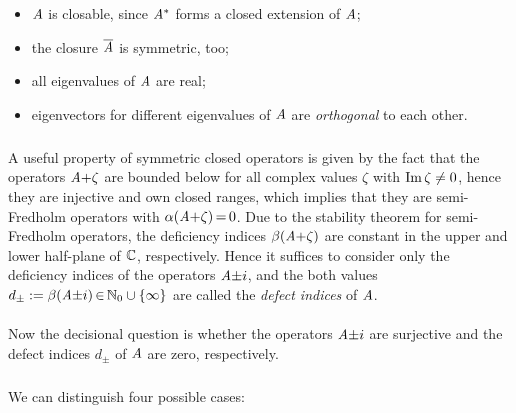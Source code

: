 \documentclass[11pt,twoside]{article}
\begin{document}
\begin{itemize}[leftmargin=9mm]
\item[(a)]
$\mathit{A}$ is closable,
since $\mathit{A}^*$ forms a closed extension of $\mathit{A}$;
\item[(b)]
the closure $\overline{\mathit{A}}$ is symmetric, too;
\item[(c)]
all eigenvalues of $\mathit{A}$ are real;
\item[(d)]
eigenvectors for different eigenvalues of $\mathit{A}$
are \textit{orthogonal} to each other.
\end{itemize}

\subparagraph{} %
A useful property of symmetric closed operators is given by the fact
that the operators $\mathit{A} {+} \zeta$ are bounded below
for all complex values $\zeta$ with $\operatorname{Im} \zeta \neq 0$,
hence they are injective and own closed ranges,
which implies that they are semi-Fredholm operators
with $\alpha(\mathit{A} {+} \zeta) {\,=\,} 0$.
Due to the stability theorem for semi-Fredholm operators,
the deficiency indices $\beta(\mathit{A} {+} \zeta)$ are constant
in the upper and lower half-plane of ${\mathbb{C}}$,
respectively.
Hence it suffices to consider only the deficiency indices 
of the operators $\mathit{A} {\pm} i$,
and the both values
$d_{\pm} := \beta(\mathit{A} {\pm} i) {\,\in\,} {\mathbb{N}}_0 \cup \{\infty\}$
are called the \textit{defect indices} of $\mathit{A}$.

\paragraph{} %
Now the decisional question is
whether the operators $\mathit{A} {\pm} i$ are surjective and
the defect indices $d_{\pm}$ of $\mathit{A}$ are zero,
respectively.

\subparagraph{}
We can distinguish four possible cases:
\end{document}
